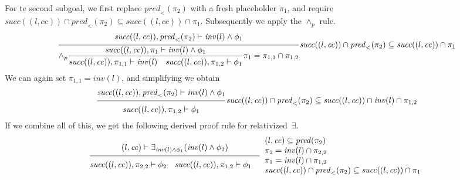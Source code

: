 \documentclass{article}
\newcommand{\proofrule}[3][]{#1 \frac{\raisebox{.7ex}{\normalsize{$#2$}}}
  {\raisebox{-1.0ex}{\normalsize{$#3$}}}}
\newcommand{\placeholder}[1][]{\pi_{#1}}
\newcommand{\loc}{l}
\newcommand{\region}{\mathit{cc}}
\newcommand{\suc}{\mathit{succ}}
\newcommand{\pre}{\mathit{pred}}
\newcommand{\inv}{\mathit{inv}}
\begin{document}
For te second subgoal, we first replace $\pre_{<}(\placeholder[2])$ with a fresh
placeholder $\placeholder[1]$, and require $\suc((\loc, \region)) \cap \pre_{<}(\placeholder[2]) \subseteq \suc((\loc, \region)) \cap \placeholder[1]$.
Subsequently we apply the $\land_p$ rule.
\[
\proofrule
{\suc((\loc, \region)), \pre_{<}(\placeholder[2]) \vdash \inv(\loc) \land \phi_1}
{\proofrule[\land_p]
  {\suc((\loc, \region)), \placeholder[1] \vdash \inv(\loc) \land \phi_1}
  {\suc((\loc, \region)), \placeholder[1,1] \vdash \inv(\loc)
  \quad \suc((\loc, \region)), \placeholder[1,2] \vdash \phi_1}
  \placeholder[1] = \placeholder[1,1] \cap \placeholder[1,2]
}
\suc((\loc, \region)) \cap \pre_{<}(\placeholder[2]) \subseteq \suc((\loc, \region)) \cap \placeholder[1]
\]
We can again set $\placeholder[1,1] = \inv(\loc)$, and simplifying we obtain
\[
\proofrule
{\suc((\loc, \region)), \pre_{<}(\placeholder[2]) \vdash \inv(\loc) \land \phi_1}
{\suc((\loc, \region)), \placeholder[1,2] \vdash \phi_1}
\suc((\loc, \region)) \cap \pre_{<}(\placeholder[2]) \subseteq \suc((\loc, \region)) \cap \inv(\loc) \cap \placeholder[1,2]
\]
%
If we combine all of this, we get the following derived proof rule for relativized~$\exists$.
\[
\proofrule
{(\loc, \region) \vdash \exists_{\inv(\loc) \land \phi_1}(\inv(\loc) \land \phi_2)}
{\suc((\loc,\region)), \placeholder[2,2] \vdash \phi_2
\quad \suc((\loc, \region)), \placeholder[1,2] \vdash \phi_1
\quad }
\begin{array}{l}
(\loc, \region) \subseteq \pre(\placeholder[2]) \\
\placeholder[2] = \inv(\loc) \cap \placeholder[2,2] \\
\placeholder[1] = \inv(\loc) \cap \placeholder[1,2] \\
\suc((\loc, \region)) \cap \pre_{<}(\placeholder[2]) \subseteq \suc((\loc, \region)) \cap \placeholder[1]
\end{array}
\]
\end{document}
